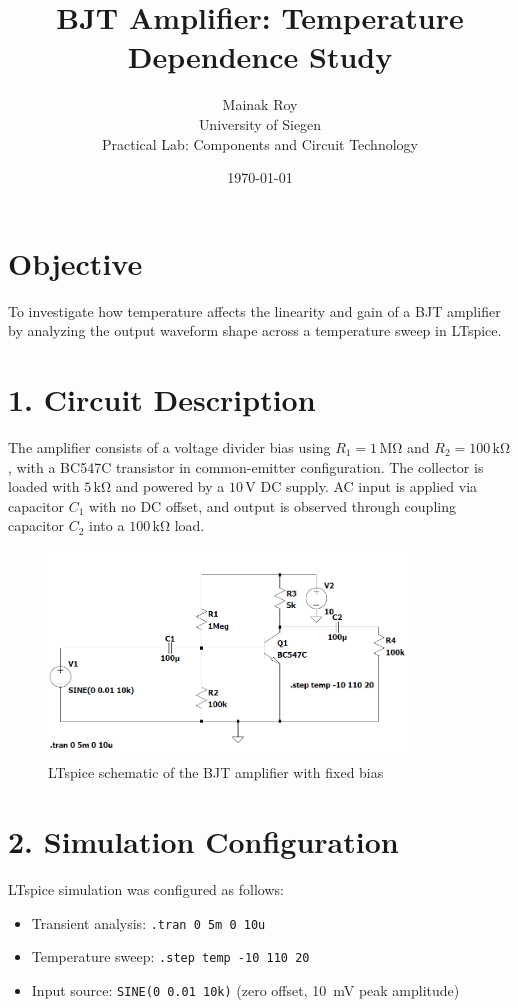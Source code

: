 \documentclass[12pt,a4paper]{article}
\title{BJT Amplifier: Temperature Dependence Study}
\author{Mainak Roy \\ University of Siegen \\ Practical Lab: Components and Circuit Technology}
\date{\today}
\begin{document}
\maketitle

\section*{Objective}
To investigate how temperature affects the linearity and gain of a BJT amplifier by analyzing the output waveform shape across a temperature sweep in LTspice.

\section*{1. Circuit Description}
The amplifier consists of a voltage divider bias using $R_1 = 1\,\mathrm{M\Omega}$ and $R_2 = 100\,\mathrm{k\Omega}$, with a BC547C transistor in common-emitter configuration. The collector is loaded with $5\,\mathrm{k\Omega}$ and powered by a $10\,\mathrm{V}$ DC supply. AC input is applied via capacitor $C_1$ with no DC offset, and output is observed through coupling capacitor $C_2$ into a $100\,\mathrm{k\Omega}$ load.

\begin{figure}[H]
    \centering
    \includegraphics[width=0.85\textwidth]{schematic.png}
    \caption{LTspice schematic of the BJT amplifier with fixed bias}
\end{figure}
\vspace{1em}
\section*{2. Simulation Configuration}
LTspice simulation was configured as follows:
\begin{itemize}
    \item Transient analysis: \texttt{.tran 0 5m 0 10u}
    \item Temperature sweep: \texttt{.step temp -10 110 20}
    \item Input source: \texttt{SINE(0 0.01 10k)} (zero offset, 10~mV peak amplitude)
\end{itemize}
\end{document}
